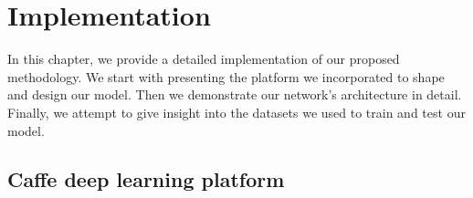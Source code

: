 
\chapter{Implementation}
\label{sec:implementation}
\noindent

\noindent In this chapter, we provide a detailed implementation of our proposed methodology. We start with presenting the platform we incorporated to shape and design our model. Then we demonstrate our network's architecture in detail. Finally, we attempt to give insight into the datasets we used to train and test our model. 

\section{Caffe deep learning platform}

